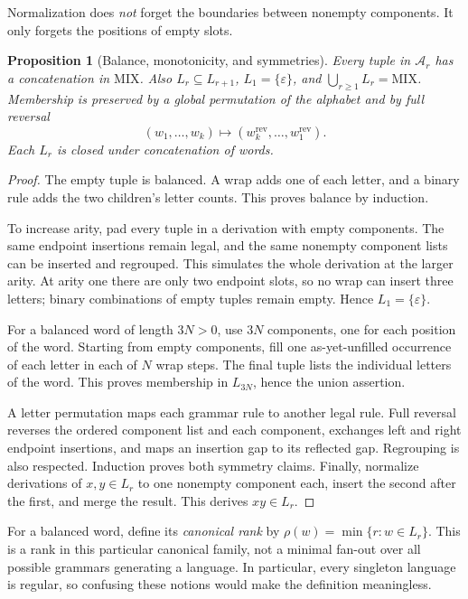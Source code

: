 \documentclass[11pt,letterpaper]{article}
\numberwithin{equation}{section}
\newtheorem{proposition}[theorem]{Proposition}
\theoremstyle{definition}
\theoremstyle{remark}
\newcommand{\A}{\mathcal A}
\newcommand{\Mix}{\mathrm{MIX}}
\newcommand{\eps}{\varepsilon}
\newcommand{\rank}{\rho}
\begin{document}
Normalization does \emph{not} forget the boundaries between nonempty
components. It only forgets the positions of empty slots.

\begin{proposition}[Balance, monotonicity, and symmetries]
\label{prop:basic}
Every tuple in \(\A_r\) has a concatenation in \(\Mix\). Also
\(L_r\subseteq L_{r+1}\), \(L_1=\{\eps\}\), and
\(\bigcup_{r\geq1}L_r=\Mix\). Membership is preserved by a global permutation
of the alphabet and by full reversal
\[
 (w_1,\ldots,w_k)\longmapsto(w_k^{\mathrm{rev}},\ldots,w_1^{\mathrm{rev}}).
\]
Each \(L_r\) is closed under concatenation of words.
\end{proposition}
\begin{proof}
The empty tuple is balanced. A wrap adds one of each letter, and a binary
rule adds the two children's letter counts. This proves balance by induction.

To increase arity, pad every tuple in a derivation with empty components.
The same endpoint insertions remain legal, and the same nonempty component
lists can be inserted and regrouped. This simulates the whole derivation
at the larger arity. At arity one there are only two endpoint slots, so no
wrap can insert three letters; binary combinations of empty tuples remain
empty. Hence \(L_1=\{\eps\}\).

For a balanced word of length \(3N>0\), use \(3N\) components, one for
each position of the word. Starting from empty components, fill one
as-yet-unfilled occurrence of each letter in each of \(N\) wrap steps.
The final tuple lists the individual letters of the word. This proves
membership in \(L_{3N}\), hence the union assertion.

A letter permutation maps each grammar rule to another legal rule. Full
reversal reverses the ordered component list and each component, exchanges
left and right endpoint insertions, and maps an insertion gap to its
reflected gap. Regrouping is also respected. Induction proves both symmetry
claims. Finally, normalize derivations of \(x,y\in L_r\) to one nonempty
component each, insert the second after the first, and merge the result.
This derives \(xy\in L_r\).
\end{proof}

For a balanced word, define its \emph{canonical rank} by
\(\rank(w)=\min\{r:w\in L_r\}\). This is a rank in this particular canonical
family, not a minimal fan-out over all possible grammars generating a
language. In particular, every singleton language is regular, so confusing
these notions would make the definition meaningless.
\end{document}
